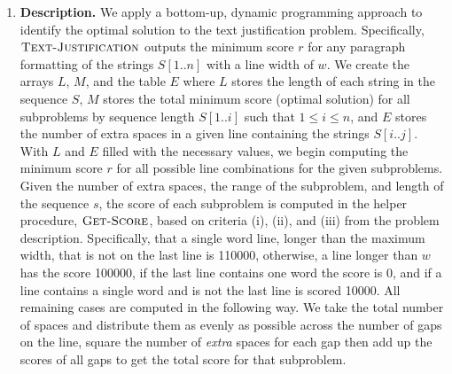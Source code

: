 \documentclass[11pt]{article}
\theoremstyle{nonumberplain}
\begin{document}
\begin{enumerate}
\item \textbf{Description.} %
  We apply a bottom-up, dynamic programming approach to identify the optimal solution to the text justification problem. Specifically, $\textnormal{\scshape Text-Justification}$ outputs the minimum score $r$ for any paragraph formatting of the strings $S[1..n]$ with a line width of $w$. %
  We create the arrays $L$, $M$, and the table $E$ where $L$ stores the length of each string in the sequence $S$, $M$ stores the total minimum score (optimal solution) for all subproblems by sequence length $S[1..i]$ such that $1 \le i \le n$, and $E$ stores the number of extra spaces in a given line containing the strings $S[i..j]$. %
  With $L$ and $E$ filled with the necessary values, we begin computing the minimum score $r$ for all possible line combinations for the given subproblems. Given the number of extra spaces, the range of the subproblem, and length of the sequence $s$, the score of each subproblem is computed in the helper procedure, $\textnormal{\scshape Get-Score}$, based on criteria (i), (ii), and (iii) from the problem description. Specifically, that a single word line, longer than the maximum width, that is not on the last line is 110000, otherwise, a line longer than $w$ has the score 100000, if the last line contains one word the score is 0, and if a line contains a single word and is not the last line is scored 10000. All remaining cases are computed in the following way. We take the total number of spaces and distribute them as evenly as possible across the number of gaps on the line, square the number of \emph{extra} spaces for each gap then add up the scores of all gaps to get the total score for that subproblem.\\ 

\end{enumerate}
\end{document}
